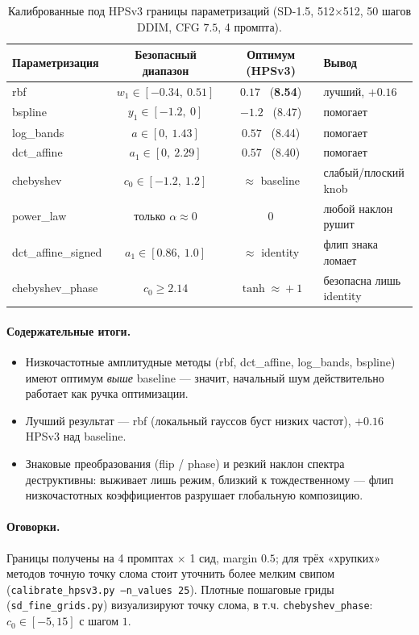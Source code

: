 \documentclass[11pt,a4paper]{article}
\newcommand{\good}[1]{\textcolor{good}{#1}}
\newcommand{\bad}[1]{\textcolor{bad}{#1}}
\begin{document}
\begin{table}[h]
\centering
\begin{tabular}{lccl}
\toprule
Параметризация & Безопасный диапазон & Оптимум (HPSv3) & Вывод \\
\midrule
\good{rbf}        & $w_1 \in [-0.34,\ 0.51]$ & $0.17$ \ (\textbf{8.54}) & \good{лучший, $+0.16$} \\
\good{bspline}    & $y_1 \in [-1.2,\ 0]$     & $-1.2$ \ (8.47)         & \good{помогает} \\
\good{log\_bands} & $a   \in [0,\ 1.43]$     & $0.57$ \ (8.44)         & \good{помогает} \\
\good{dct\_affine}& $a_1 \in [0,\ 2.29]$     & $0.57$ \ (8.40)         & \good{помогает} \\
chebyshev         & $c_0 \in [-1.2,\ 1.2]$   & $\approx$ baseline       & слабый/плоский knob \\
\bad{power\_law}  & только $\alpha \approx 0$& $0$                      & \bad{любой наклон рушит} \\
\bad{dct\_affine\_signed} & $a_1 \in [0.86,\ 1.0]$ & $\approx$ identity  & \bad{флип знака ломает} \\
\bad{chebyshev\_phase}    & $c_0 \ge 2.14$         & $\tanh\!\approx\!+1$ & \bad{безопасна лишь identity} \\
\bottomrule
\end{tabular}
\caption{Калиброванные под HPSv3 границы параметризаций (SD-1.5, 512$\times$512,
50 шагов DDIM, CFG $7.5$, 4 промпта).}
\end{table}

\paragraph{Содержательные итоги.}
\begin{itemize}
\item Низкочастотные амплитудные методы (rbf, dct\_affine, log\_bands, bspline)
      имеют оптимум \emph{выше} baseline — значит, начальный шум действительно
      работает как ручка оптимизации.
\item Лучший результат — \good{rbf} (локальный гауссов буст низких частот),
      $+0.16$ HPSv3 над baseline.
\item Знаковые преобразования (flip / phase) и резкий наклон спектра
      \bad{деструктивны}: выживает лишь режим, близкий к тождественному — флип
      низкочастотных коэффициентов разрушает глобальную композицию.
\end{itemize}

\paragraph{Оговорки.} Границы получены на 4 промптах $\times$ 1 сид, margin $0.5$;
для трёх «хрупких» методов точную точку слома стоит уточнить более мелким
свипом (\texttt{calibrate\_hpsv3.py --n\_values 25}). Плотные пошаговые гриды
(\texttt{sd\_fine\_grids.py}) визуализируют точку слома, в т.ч.
\texttt{chebyshev\_phase}: $c_0 \in [-5, 15]$ с шагом $1$.
\end{document}
